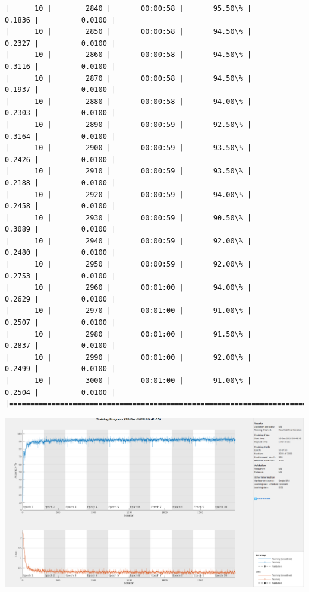 \documentclass[11pt]{article}
\makeatletter
\def\maxwidth{\ifdim\Gin@nat@width>\linewidth\linewidth
    \else\Gin@nat@width\fi}
\let\Oldincludegraphics\includegraphics
\renewcommand{\includegraphics}[1]{\Oldincludegraphics[width=.8\maxwidth]{#1}}
\makeatother
\begin{document}
\begin{Verbatim}[commandchars=\\\{\}]
|      10 |        2840 |       00:00:58 |       95.50\% |       0.1836 |          0.0100 |
|      10 |        2850 |       00:00:58 |       94.50\% |       0.2327 |          0.0100 |
|      10 |        2860 |       00:00:58 |       94.50\% |       0.3116 |          0.0100 |
|      10 |        2870 |       00:00:58 |       94.50\% |       0.1937 |          0.0100 |
|      10 |        2880 |       00:00:58 |       94.00\% |       0.2303 |          0.0100 |
|      10 |        2890 |       00:00:59 |       92.50\% |       0.3164 |          0.0100 |
|      10 |        2900 |       00:00:59 |       93.50\% |       0.2426 |          0.0100 |
|      10 |        2910 |       00:00:59 |       93.50\% |       0.2188 |          0.0100 |
|      10 |        2920 |       00:00:59 |       94.00\% |       0.2458 |          0.0100 |
|      10 |        2930 |       00:00:59 |       90.50\% |       0.3089 |          0.0100 |
|      10 |        2940 |       00:00:59 |       92.00\% |       0.2480 |          0.0100 |
|      10 |        2950 |       00:00:59 |       92.00\% |       0.2753 |          0.0100 |
|      10 |        2960 |       00:01:00 |       94.00\% |       0.2629 |          0.0100 |
|      10 |        2970 |       00:01:00 |       91.00\% |       0.2507 |          0.0100 |
|      10 |        2980 |       00:01:00 |       91.50\% |       0.2837 |          0.0100 |
|      10 |        2990 |       00:01:00 |       92.00\% |       0.2499 |          0.0100 |
|      10 |        3000 |       00:01:00 |       91.00\% |       0.2504 |          0.0100 |
|========================================================================================|

    \end{Verbatim}

    \includegraphics{f_train.png}
\end{document}
